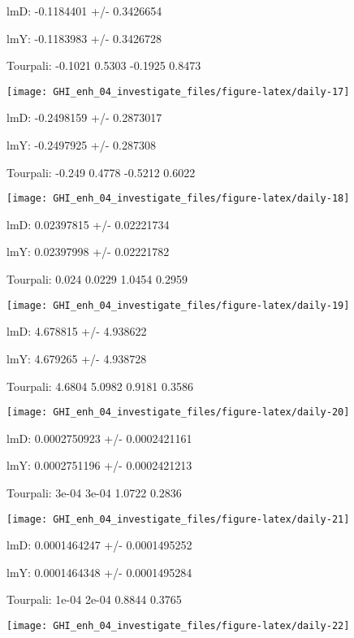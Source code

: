 \documentclass[
  10pt,
  a4paper,oneside]{article}
\begin{document}
lmD: -0.1184401 +/- 0.3426654

lmY: -0.1183983 +/- 0.3426728

Tourpali: -0.1021 0.5303 -0.1925 0.8473

\begin{center}\texttt{[image: GHI\_enh\_04\_investigate\_files/figure-latex/daily-17]} \end{center}

lmD: -0.2498159 +/- 0.2873017

lmY: -0.2497925 +/- 0.287308

Tourpali: -0.249 0.4778 -0.5212 0.6022

\begin{center}\texttt{[image: GHI\_enh\_04\_investigate\_files/figure-latex/daily-18]} \end{center}

lmD: 0.02397815 +/- 0.02221734

lmY: 0.02397998 +/- 0.02221782

Tourpali: 0.024 0.0229 1.0454 0.2959

\begin{center}\texttt{[image: GHI\_enh\_04\_investigate\_files/figure-latex/daily-19]} \end{center}

lmD: 4.678815 +/- 4.938622

lmY: 4.679265 +/- 4.938728

Tourpali: 4.6804 5.0982 0.9181 0.3586

\begin{center}\texttt{[image: GHI\_enh\_04\_investigate\_files/figure-latex/daily-20]} \end{center}

lmD: 0.0002750923 +/- 0.0002421161

lmY: 0.0002751196 +/- 0.0002421213

Tourpali: 3e-04 3e-04 1.0722 0.2836

\begin{center}\texttt{[image: GHI\_enh\_04\_investigate\_files/figure-latex/daily-21]} \end{center}

lmD: 0.0001464247 +/- 0.0001495252

lmY: 0.0001464348 +/- 0.0001495284

Tourpali: 1e-04 2e-04 0.8844 0.3765

\begin{center}\texttt{[image: GHI\_enh\_04\_investigate\_files/figure-latex/daily-22]} \end{center}
\end{document}
